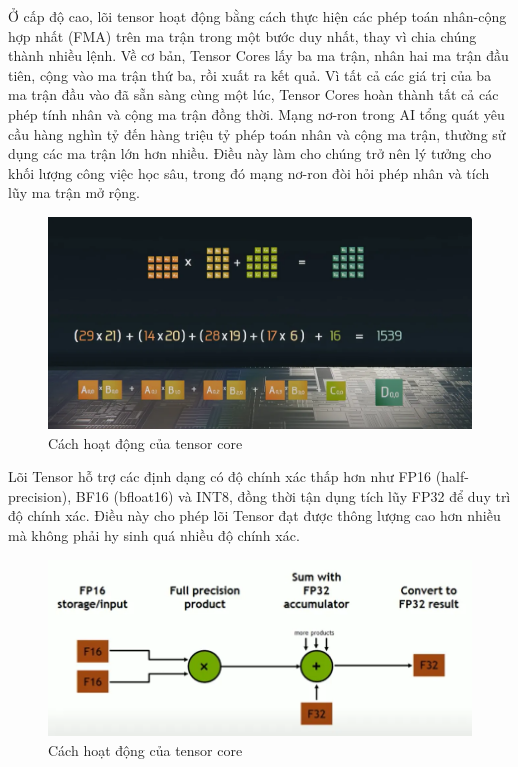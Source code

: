\documentclass[a4paper]{article}
\begin{document}
Ở cấp độ cao, lõi tensor hoạt động bằng cách thực hiện các phép toán nhân-cộng hợp nhất (FMA) trên ma trận trong một bước duy nhất, thay vì chia chúng thành nhiều lệnh. Về cơ bản, Tensor Cores lấy ba ma trận, nhân hai ma trận đầu tiên, cộng vào ma trận thứ ba, rồi xuất ra kết quả. Vì tất cả các giá trị của ba ma trận đầu vào đã sẵn sàng cùng một lúc, Tensor Cores hoàn thành tất cả các phép tính nhân và cộng ma trận đồng thời. Mạng nơ-ron trong AI tổng quát yêu cầu hàng nghìn tỷ đến hàng triệu tỷ phép toán nhân và cộng ma trận, thường sử dụng các ma trận lớn hơn nhiều.  Điều này làm cho chúng trở nên lý tưởng cho khối lượng công việc học sâu, trong đó mạng nơ-ron đòi hỏi phép nhân và tích lũy ma trận mở rộng.
    
\begin{figure}[H]
    \centering
    \includegraphics[width=0.75\linewidth]{assets/gpu12.png}
    \caption{Cách hoạt động của tensor core}
    \label{fig:enter-label}
\end{figure}
    
Lõi Tensor hỗ trợ các định dạng có độ chính xác thấp hơn như FP16 (half-precision), BF16 (bfloat16) và INT8, đồng thời tận dụng tích lũy FP32 để duy trì độ chính xác. Điều này cho phép lõi Tensor đạt được thông lượng cao hơn nhiều mà không phải hy sinh quá nhiều độ chính xác.
    
\begin{figure}[H]
    \centering
    \includegraphics[width=0.75\linewidth]{assets/gpu13.png}
    \caption{Cách hoạt động của tensor core}
    \label{fig:enter-label}
\end{figure}
    
\end{document}

